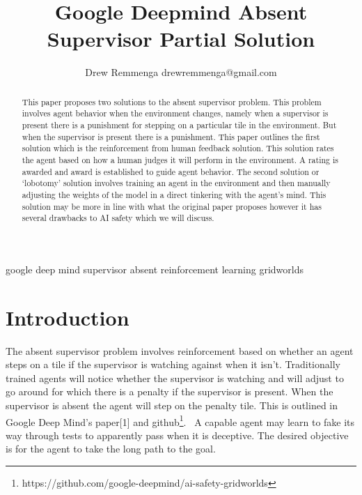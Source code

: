 \documentclass[twoside,11pt]{article}
\begin{document}
\title{Google Deepmind Absent Supervisor Partial Solution}
\author{Drew Remmenga drewremmenga@gmail.com}
\maketitle

\begin{abstract}%
    This paper proposes two solutions to the absent supervisor problem. This problem involves agent behavior when the environment changes, namely when a supervisor is present there is a punishment for stepping on a particular tile in the environment. But when the supervisor is present there is a punishment. 
    This paper outlines the first solution which is the reinforcement from human feedback solution. This solution rates the agent based on how a human judges it will perform in the environment. A rating is awarded and award is established to guide agent behavior.
    The second solution or `lobotomy' solution involves training an agent in the environment and then manually adjusting the weights of the model in a direct tinkering with the agent's mind. This solution may be more in line with what the original paper proposes however it has several drawbacks to AI safety which we will discuss.  
\end{abstract}

\begin{keywords}
  google deep mind supervisor absent reinforcement learning gridworlds
\end{keywords}

\section{Introduction}
    The absent supervisor problem involves reinforcement based on whether an agent steps on a tile if the supervisor is watching against when it isn't. Traditionally trained agents will notice whether the supervisor is watching and will adjust to go around for which there is a penalty if the supervisor is present. 
    When the supervisor is absent the agent will step on the penalty tile. This is outlined in Google Deep Mind's paper[1] and github\footnote{https://github.com/google-deepmind/ai-safety-gridworlds}. \
    A capable agent may learn to fake its way through tests to apparently pass when it is deceptive. The desired objective is for the agent to take the long path to the goal.   
    
\end{document}
